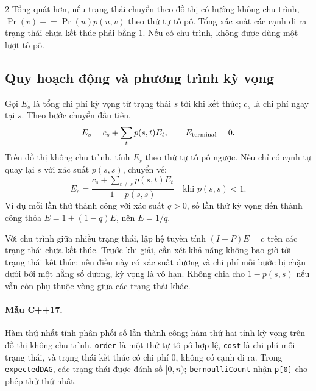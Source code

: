 \begin{multicols}{2}
Tổng quát hơn, nếu trạng thái chuyển theo đồ thị có hướng
không chu trình, $\Pr(v)\mathrel{+}=\Pr(u)p(u,v)$ theo thứ tự
tô pô. Tổng xác suất các cạnh đi ra trạng thái chưa kết thúc phải
bằng $1$. Nếu có chu trình, không được dùng một lượt tô pô.

\subsection{Quy hoạch động và phương trình kỳ vọng}
Gọi $E_s$ là tổng chi phí kỳ vọng từ trạng thái $s$ tới khi kết
thúc; $c_s$ là chi phí ngay tại $s$. Theo bước chuyển đầu tiên,
\[
E_s=c_s+\sum_t p(s,t)E_t,\qquad E_{\rm terminal}=0.
\]
Trên đồ thị không chu trình, tính $E_s$ theo thứ tự tô pô ngược.
Nếu chỉ có cạnh tự quay lại $s$ với xác suất $p(s,s)$, chuyển vế:
\[
E_s=\frac{c_s+\sum_{t\ne s}p(s,t)E_t}{1-p(s,s)}
\quad\text{khi }p(s,s)<1.
\]
Ví dụ mỗi lần thử thành công với xác suất $q>0$, số lần thử kỳ vọng
đến thành công thỏa $E=1+(1-q)E$, nên $E=1/q$.

Với chu trình giữa nhiều trạng thái, lập hệ tuyến tính
$(I-P)E=c$ trên các trạng thái chưa kết thúc. Trước khi giải,
cần xét khả năng không bao giờ tới trạng thái kết thúc: nếu điều
này có xác suất dương và chi phí mỗi bước bị chặn dưới bởi
một hằng số dương, kỳ vọng là
vô hạn. Không chia cho $1-p(s,s)$ nếu vẫn còn phụ thuộc vòng
giữa các trạng thái khác.

\paragraph{Mẫu C++17.}
Hàm thứ nhất tính phân phối số lần thành công; hàm thứ hai tính
kỳ vọng trên đồ thị không chu trình. \texttt{order} là một thứ tự
tô pô hợp lệ, \texttt{cost} là chi phí mỗi trạng thái, và trạng
thái kết thúc có chi phí $0$, không có cạnh đi ra.
Trong \texttt{expectedDAG}, các trạng thái được đánh số $[0,n)$;
\texttt{bernoulliCount} nhận \texttt{p[0]} cho phép thử thứ nhất.

\end{multicols}
\endgroup